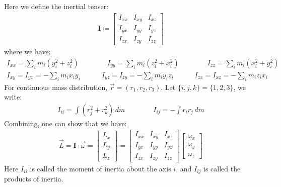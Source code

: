 \documentclass[11pt,oneside]{book}
\theoremstyle{break}
\theoremstyle{break}
\begin{document}
Here we define the inertial tenser:
\begin{align*}
\mathbf{I} \coloneqq \begin{bmatrix}
I_{xx} & I_{xy} & I_{xz} \\
I_{yx} & I_{yy} & I_{yz}\\
I_{zx} & I_{zy} & I_{zz}
\end{bmatrix}
\end{align*}
where we have:
\begin{align*}
I_{xx} = \sum_i m_i (y_i^2 + z_i^2) \qquad \qquad I_{yy} = \sum_i m_i(z_i^2 + x_i^2) \qquad\qquad I_{zz} = \sum_i m_i (x_i^2 + y_i^2)
\end{align*}
\begin{align*}
I_{xy} = I_{yx} = -\sum_i m_i x_i y_i \qquad \quad I_{yz} = I_{zy} = -\sum_i m_i y_i z_i \qquad\quad I_{zx} = I_{xz} = -\sum_i m_i z_i x_i
\end{align*}
For continuous mass distribution, $\vec{r} = (r_1, r_2, r_3)$. Let $\{i,j,k\} = \{1,2,3\}$, we write:
\begin{align*}
I_{ii} = \int (r_j^2 + r_k^2) \, dm \qquad \qquad I_{ij} = -\int r_ir_j\, dm
\end{align*}
Combining, one can show that we have:
\begin{align*}
\vec{L} = \mathbf{I}\cdot \vec{\omega} = \begin{bmatrix}
L_x \\ L_y \\ L_z
\end{bmatrix} = 
\begin{bmatrix}
I_{xx} & I_{xy} & I_{xz} \\
I_{yx} & I_{yy} & I_{yz}\\
I_{zx} & I_{zy} & I_{zz}
\end{bmatrix} 
\begin{bmatrix}
\omega_x \\ 
\omega_y \\
\omega_z
\end{bmatrix}
\end{align*}
Here $I_{ii}$ is called the moment of inertia about the axis $i$, and $I_{ij}$ is called the products of inertia.\\
\end{document}
